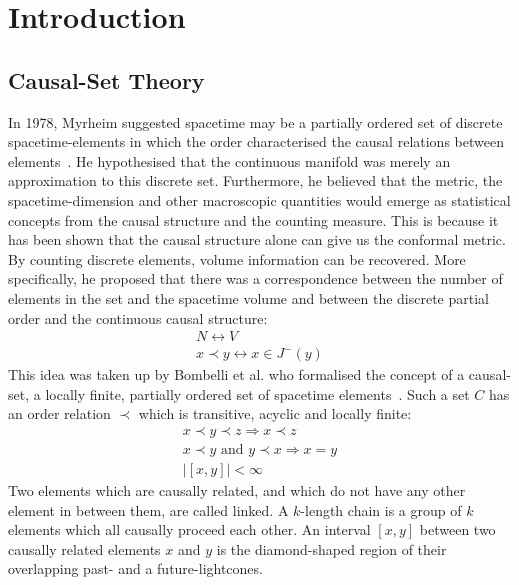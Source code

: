 \documentclass[a4paper,12pt]{article}
\numberwithin{equation}{section}
\begin{document}
\vspace{.6cm}

\newpage

\label{sec:Contents}
\renewcommand{\contentsname}{Contents\\} 

\tableofcontents

\newpage

\section{Introduction}
\label{sec:Introduction}
\subsection{Causal-Set Theory}
\label{sec:Causal-Set Theory}

In 1978, Myrheim suggested spacetime may be a partially ordered set of discrete spacetime-elements in which the order characterised the causal relations between elements~\cite{Myrheim1978}. He hypothesised that the continuous manifold was merely an approximation to this discrete set. Furthermore, he believed that the metric, the spacetime-dimension and other macroscopic quantities would emerge as statistical concepts from the causal structure and the counting measure. This is because it has been shown that the causal structure alone can give us the conformal metric. By counting discrete elements, volume information can be recovered. More specifically, he proposed that there was a correspondence between the number of elements in the set and the spacetime volume and between the discrete partial order and the continuous causal structure:
\begin{subequations}
\label{eq:Correspondence}
\begin{gather}
N\longleftrightarrow V \\
x\prec y\longleftrightarrow x\in J^{-}(y)
\end{gather}
\end{subequations}
This idea was taken up by Bombelli et al. who formalised the concept of a causal-set, a locally finite, partially ordered set of spacetime elements~\cite{Bombelli1987}. Such a set $C$ has an order relation $\prec$ which is transitive, acyclic and locally finite:
\begin{subequations}
\label{eq:Axioms}
\begin{gather}
x\prec y\prec z\Longrightarrow x\prec z \\
x\prec y \text{ and } y\prec x\Longrightarrow x=y \\
|[x, y]| < \infty
\end{gather}
\end{subequations}
Two elements which are causally related, and which do not have any other element in between them, are called linked. A $k$-length chain is a group of $k$ elements which all causally proceed each other. An interval $[x, y]$ between two causally related elements $x$ and $y$ is the diamond-shaped region of their overlapping past- and a future-lightcones.
\end{document}
